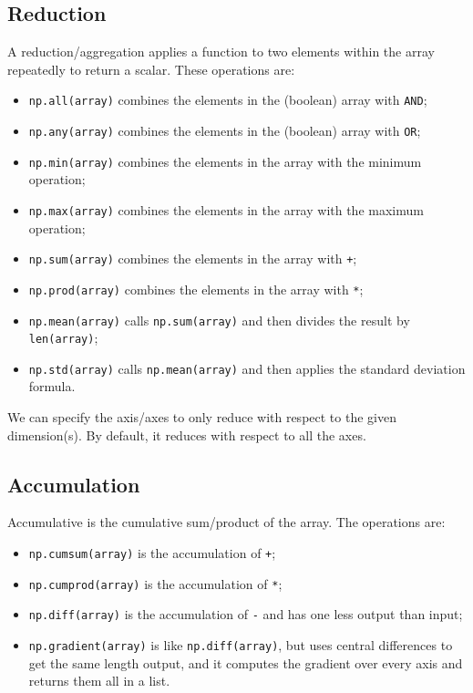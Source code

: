 \documentclass[a4paper, openany]{memoir}
\begin{document}
    \subsection{Reduction}
    A reduction/aggregation applies a function to two elements within the array repeatedly to return a scalar. These operations are:
    \begin{itemize}
        \item \texttt{np.all(array)} combines the elements in the (boolean) array with \texttt{AND};
        \item \texttt{np.any(array)} combines the elements in the (boolean) array with \texttt{OR};
        \item \texttt{np.min(array)} combines the elements in the array with the minimum operation;
        \item \texttt{np.max(array)} combines the elements in the array with the maximum operation;
        \item \texttt{np.sum(array)} combines the elements in the array with \texttt{+};
        \item \texttt{np.prod(array)} combines the elements in the array with \texttt{*};
        \item \texttt{np.mean(array)} calls \texttt{np.sum(array)} and then divides the result by \texttt{len(array)};
        \item \texttt{np.std(array)} calls \texttt{np.mean(array)} and then applies the standard deviation formula.
    \end{itemize}
    We can specify the axis/axes to only reduce with respect to the given dimension(s). By default, it reduces with respect to all the axes.

    \subsection{Accumulation}
    Accumulative is the cumulative sum/product of the array. The operations are:
    \begin{itemize}
        \item \texttt{np.cumsum(array)} is the accumulation of \texttt{+};
        \item \texttt{np.cumprod(array)} is the accumulation of \texttt{*};
        \item \texttt{np.diff(array)} is the accumulation of \texttt{-} and has one less output than input;
        \item \texttt{np.gradient(array)} is like \texttt{np.diff(array)}, but uses central differences to get the same length output, and it computes the gradient over every axis and returns them all in a list.
    \end{itemize}
\end{document}
